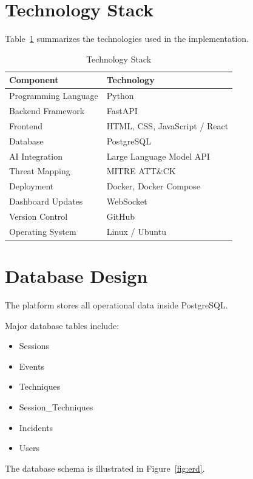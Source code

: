 \documentclass[12pt,a4paper]{report}
\begin{document}
\section{Technology Stack}

Table~\ref{tab:techstack} summarizes the technologies used in the implementation.

\begin{table}[H]
\centering
\caption{Technology Stack}
\label{tab:techstack}
\begin{tabular}{|p{5cm}|p{8cm}|}
\hline
Component & Technology \\
\hline
Programming Language & Python \\
\hline
Backend Framework & FastAPI \\
\hline
Frontend & HTML, CSS, JavaScript / React \\
\hline
Database & PostgreSQL \\
\hline
AI Integration & Large Language Model API \\
\hline
Threat Mapping & MITRE ATT\&CK \\
\hline
Deployment & Docker, Docker Compose \\
\hline
Dashboard Updates & WebSocket \\
\hline
Version Control & GitHub \\
\hline
Operating System & Linux / Ubuntu \\
\hline
\end{tabular}
\end{table}


\section{Database Design}

The platform stores all operational data inside PostgreSQL.

Major database tables include:

\begin{itemize}
\item Sessions
\item Events
\item Techniques
\item Session\_Techniques
\item Incidents
\item Users
\end{itemize}

The database schema is illustrated in Figure~\ref{fig:erd}.
\end{document}
